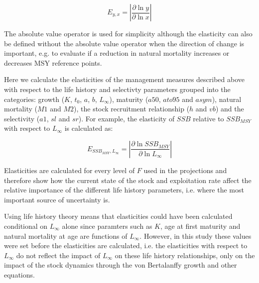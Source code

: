 \documentclass{pnastwo}
\begin{document}
\begin{article}
\begin{equation}
E_{y,x} = \left| \frac{\partial \ln y}{\partial \ln x} \right|        
%
\end{equation} 

The absolute value operator is used for simplicity although the elasticity can also be defined without the absolute value operator when the direction of 
change is important, e.g. to evaluate if a reduction in natural mortality increases or decreases MSY reference points.	

Here we calculate the elasticities of the management measures described above with respect to the life history and selectivty parameters grouped into the
categories: growth ($K$, $t_0$, $a$, $b$, $L_{\infty}$), maturity ($a50$, $ato95$ and $asym$), natural mortality ($M1$ and $M2$), the stock recruitment
relationship ($h$ and $vb$) and the selectivity ($a1$, $sl$ and $sr$). For example, the elasticity of $SSB$ relative to $SSB_{MSY}$ with respect to $L_{\infty}$ is calculated as:

\begin{equation}
E_{SSB_{MSY},L_{\infty}} = \left| \frac{\partial \ln SSB_{MSY}}{\partial \ln L_{\infty}} \right|
\end{equation}

Elasticities are calculated for every level of $F$ used in the projections and therefore show how the current state of the stock and exploitation rate
affect the relative importance of the different life history parameters, i.e. where the most important source of uncertainty is.

Using life history theory means that elasticities could have been calculated conditional on $L_{\infty}$ alone since paramters such as $K$, age at first maturity 
and natural mortality at age are functions of $L_{\infty}$. However, in this study these values were set before the elasticities are calculated, i.e. the elasticities 
with respect to $L_{\infty}$ do not reflect the impact of $L_{\infty}$ on these life history relationships, only on the impact of the stock dynamics 
through the von Bertalanffy growth and other equations.  


\end{article}
\end{document}
